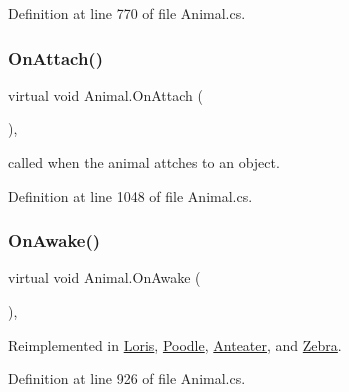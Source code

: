 Definition at line 770 of file Animal.\+cs.

\mbox{\label{class_animal_a1f3b9a46215ec3e502ff609bbf0b4e78}} 
\subsubsection{\texorpdfstring{On\+Attach()}{OnAttach()}}
{\footnotesize\ttfamily virtual void Animal.\+On\+Attach (\begin{DoxyParamCaption}{ }\end{DoxyParamCaption})\hspace{0.3cm}{\ttfamily [protected]}, {\ttfamily [virtual]}}



called when the animal attches to an object. 



Definition at line 1048 of file Animal.\+cs.

\mbox{\label{class_animal_a8ed14f752254b7033466bbd0c846a972}} 
\subsubsection{\texorpdfstring{On\+Awake()}{OnAwake()}}
{\footnotesize\ttfamily virtual void Animal.\+On\+Awake (\begin{DoxyParamCaption}{ }\end{DoxyParamCaption})\hspace{0.3cm}{\ttfamily [protected]}, {\ttfamily [virtual]}}



Reimplemented in \mbox{\hyperlink{class_loris_abf831310421343c4685d7fb6844c522b}{Loris}}, \mbox{\hyperlink{class_poodle_ac1de5bc05d00449271365b51f90ef80f}{Poodle}}, \mbox{\hyperlink{class_anteater_a616439e723d734df132d25a0a69f2e4a}{Anteater}}, and \mbox{\hyperlink{class_zebra_a8111cfb00cc72c135c1840c4760855f2}{Zebra}}.



Definition at line 926 of file Animal.\+cs.

\mbox{\label{class_animal_a86612d846fcd1fcf08f7b89586aa11b7}} 
